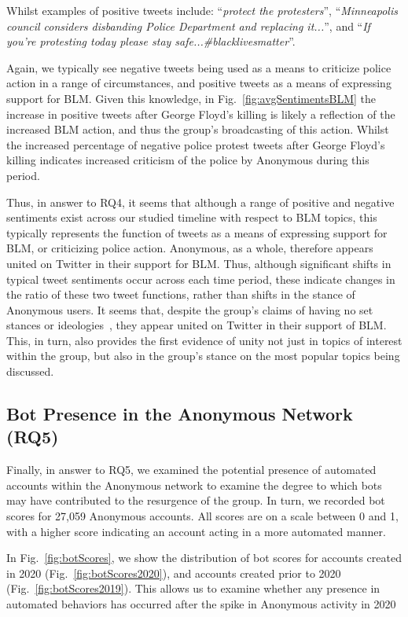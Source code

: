 \documentclass[letterpaper]{article}
\begin{document}
Whilst examples of positive tweets include: ``\textit{protect the protesters}'', ``\textit{Minneapolis council considers disbanding Police Department and replacing it...}'', and ``\textit{If you're protesting today please stay safe...\#blacklivesmatter}''.

Again, we typically see negative tweets being used as a means to criticize police action in a range of circumstances, and positive tweets as a means of expressing support for BLM. Given this knowledge, in Fig.~\ref{fig:avgSentimentsBLM} the increase in positive tweets after George Floyd's killing is likely a reflection of the increased BLM action, and thus the group's broadcasting of this action. Whilst the increased percentage of negative police protest tweets after George Floyd's killing indicates increased criticism of the police by Anonymous during this period.

Thus, in answer to RQ4, it seems that although a range of positive and negative sentiments exist across our studied timeline with respect to BLM topics, this typically represents the function of tweets as a means of expressing support for BLM, or criticizing police action. Anonymous, as a whole, therefore appears united on Twitter in their support for BLM. Thus, although significant shifts in typical tweet sentiments occur across each time period, these indicate changes in the ratio of these two tweet functions, rather than shifts in the stance of Anonymous users. It seems that, despite the group's claims of having no set stances or ideologies~\cite{Olson2013}, they appear united on Twitter in their support of BLM. This, in turn, also provides the first evidence of unity not just in topics of interest within the group, but also in the group's stance on the most popular topics being discussed.

\subsection{Bot Presence in the Anonymous Network (RQ5)}

Finally, in answer to RQ5, we examined the potential presence of automated accounts within the Anonymous network to examine the degree to which bots may have contributed to the resurgence of the group. In turn, we recorded bot scores for 27,059 Anonymous accounts. All scores are on a scale between 0 and 1, with a higher score indicating an account acting in a more automated manner.

In Fig.~\ref{fig:botScores}, we show the distribution of bot scores for accounts created in 2020 (Fig.~\ref{fig:botScores2020}), and accounts created prior to 2020 (Fig.~\ref{fig:botScores2019}). This allows us to examine whether any presence in automated behaviors has occurred after the spike in Anonymous activity in 2020
\end{document}
